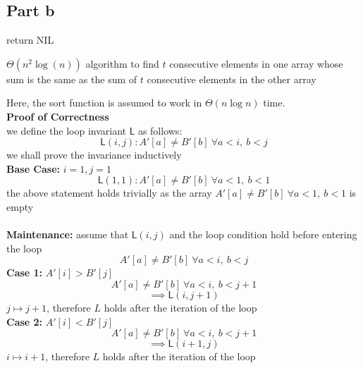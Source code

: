 \documentclass{article}
\begin{document}
\subsection*{Part b}
\begin{algorithm}
    return NIL\;
    \caption{$\varTheta(n^2 \log(n))$ algorithm to find $t$ consecutive elements in one array whose sum is the same as the sum of $t$ consecutive elements in the other array}
\end{algorithm}
Here, the sort function is assumed to work in $\varTheta(n \log n)$ time.\\
\textbf{Proof of Correctness}\\
we define the loop invariant $\mathsf{L}$ as follows:\\
$$\mathsf{L}(i, j): A'[a] \neq B'[b] ~ \forall a < i, ~ b < j$$
we shall prove the invariance inductively\\
\textbf{Base Case:} $i = 1, j = 1$\\
$$\mathsf{L}(1, 1): A'[a] \neq B'[b] ~ \forall a < 1, ~ b < 1$$
the above statement holds trivially as the array $A'[a] \neq B'[b] ~ \forall a < 1, ~ b < 1$ is empty\\\\
\textbf{Maintenance:} assume that $\mathsf{L}(i, j)$ and the loop condition hold before entering the loop\\
$$A'[a] \neq B'[b] ~ \forall a < i, ~ b < j$$
\textbf{Case 1:} $A'[i] > B'[j]$\\
    $$A'[a] \neq B'[b] ~ \forall a < i, ~ b < j+1$$
    $$\implies \mathsf{L}(i, j+1)$$
    $j \mapsto j+1$, therefore $L$ holds after the iteration of the loop\\
\textbf{Case 2:} $A'[i] < B'[j]$\\
    $$A'[a] \neq B'[b] ~ \forall a < i, ~ b < j+1$$
    $$\implies \mathsf{L}(i+1, j)$$
    $i \mapsto i+1$, therefore $L$ holds after the iteration of the loop\\
\end{document}
